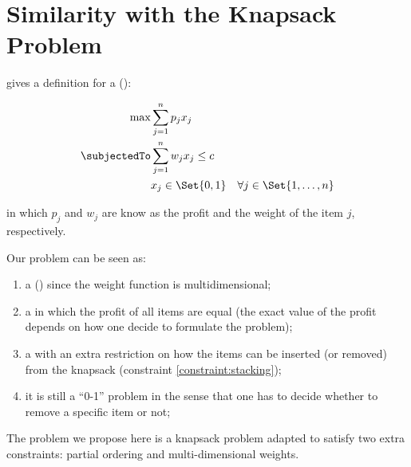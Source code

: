 \section{Similarity with the Knapsack Problem}

\cite{bib:knapsack-problems} gives a definition for a \zoKPV (\zoKP):

\begin{eqnarray}
	\label{problem:knapsack-problem}
	\max & \displaystyle\sum\limits_{j=1}^{n} p_j x_j \\
	\subjectedTo
		& \displaystyle\sum\limits_{j=1}^{n} w_j x_j \leq c \nonumber\\
		& x_j \in \Set{0, 1} \quad \forall j \in \Set{1, \dots, n} \nonumber
\end{eqnarray}

in which $p_j$ and $w_j$ are know as the profit and the weight of the item $j$, respectively.

Our problem can be seen as:

\begin{enumerate}
	\item a \MKPV (\MKP) since the weight function is multidimensional;
	\item a \zoKP in which the profit of all items are equal (the exact value of the profit depends on how one decide to formulate the problem);
	\item a \zoKP with an extra restriction on how the items can be inserted (or removed) from the knapsack (constraint \eqref{constraint:stacking});
	\item it is still a ``0-1'' problem in the sense that one has to decide whether to remove a specific item or not;
\end{enumerate}

The problem we propose here is a knapsack problem adapted to satisfy two extra constraints: partial ordering and multi-dimensional weights.
